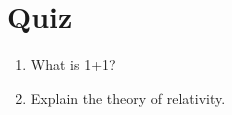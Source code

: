\documentclass{article}
\begin{document}
\section{Quiz}
\begin{enumerate}
    \item What is 1+1?
    \item Explain the theory of relativity.
\end{enumerate}
\end{document}
